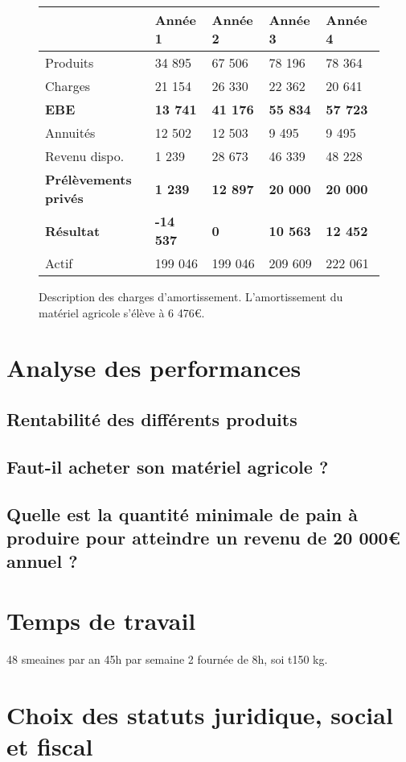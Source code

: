 \documentclass{book}
\begin{document}
\begin{figure}[h!]
\footnotesize
\center
\begin{tabular}{ | p{3cm} | p{}| p{}| p{}| p{}| }
\hline
	& Année 1 & Année 2 & Année 3 & Année 4 \  \\ \hline
	Produits & 34 895 & 67 506 & 78 196 & 78 364 \\ \hline
	Charges & 21 154 & 26 330 & 22 362 & 20 641 \\ \hline
	\textbf{EBE} & \textbf{13 741} & \textbf{41 176} & \textbf{55 834} & \textbf{57 723} \\ \hline
	\hline
	Annuités & 12 502 & 12 503 & 9 495 & 9 495 \\ \hline
	Revenu dispo. & 1 239 & 28 673 & 46 339 & 48 228 \\ \hline
	\textbf{Prélèvements privés} & \textbf{1 239} & \textbf{12 897} & \textbf{20 000} & \textbf{20 000} \\ \hline
	\hline
	\textbf{Résultat} & \textbf{-14 537} & \textbf{0} & \textbf{10 563} & \textbf{12 452} \\ \hline
	Actif & 199 046 & 199 046 & 209 609 & 222 061 \\ \hline
\end{tabular}
\caption{Description des charges d'amortissement. L'amortissement du matériel agricole s'élève à 6 476\euro{}.}
\label{tab:amortissement}
\end{figure}

\section{Analyse des performances}

\subsection{Rentabilité des différents produits}

\subsection{Faut-il acheter son matériel agricole ?}


\subsection{Quelle est la quantité minimale de pain à produire pour atteindre un revenu de 20 000\euro{} annuel ?}
\label{part:reduc_pain}

\section{Temps de travail}
\label{part:tps_travail}

48 smeaines par an
45h par semaine
2 fournée de 8h, soi t150 kg.

\section{Choix des statuts juridique, social et fiscal}
\end{document}
